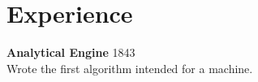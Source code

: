 \section*{Experience}
\textbf{Analytical Engine} \hfill 1843\\
Wrote the first algorithm intended for a machine.
